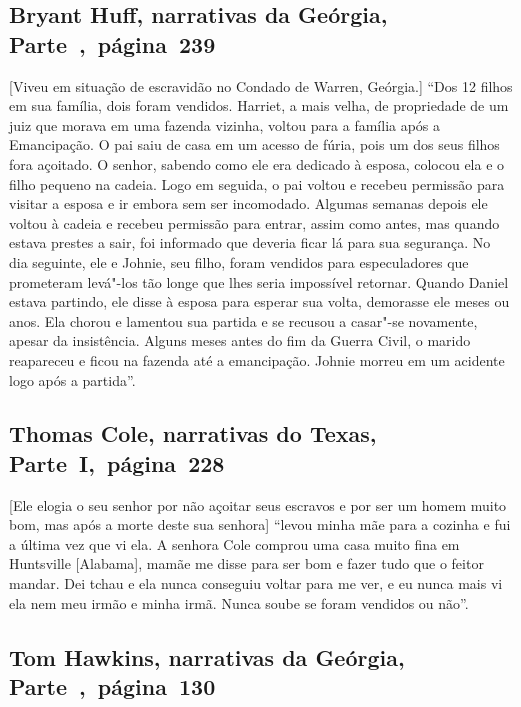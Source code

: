 \subsection{Bryant Huff, narrativas da Geórgia, Parte~,~página~239}
\label{ref152}

{[}Viveu em situação de escravidão no Condado de Warren, Geórgia.{]} ``Dos 12 filhos em sua família, dois foram vendidos. Harriet, a mais
velha, de propriedade de um juiz que morava em uma fazenda vizinha,
voltou para a família após a Emancipação. O pai saiu de casa em um
acesso de fúria, pois um dos seus filhos fora açoitado. O senhor,
sabendo como ele era dedicado à esposa, colocou ela e o filho pequeno na
cadeia. Logo em seguida, o pai voltou e recebeu permissão para visitar a
esposa e ir embora sem ser incomodado. Algumas semanas depois ele voltou
à cadeia e recebeu permissão para entrar, assim como antes, mas quando
estava prestes a sair, foi informado que deveria ficar lá para sua
segurança. No dia seguinte, ele e Johnie, seu filho, foram vendidos para
especuladores que prometeram levá"-los tão longe que lhes seria
impossível retornar. Quando Daniel estava partindo, ele disse à esposa
para esperar sua volta, demorasse ele meses ou anos. Ela chorou e
lamentou sua partida e se recusou a casar"-se novamente, apesar da
insistência. Alguns meses antes do fim da Guerra Civil, o marido
reapareceu e ficou na fazenda até a emancipação. Johnie morreu em um
acidente logo após a partida''.

\subsection{Thomas Cole, narrativas do Texas, Parte~I,~página~228} \label{ref56}

{[}Ele elogia o seu senhor por não açoitar seus escravos e por ser um
homem muito bom, mas após a morte deste sua senhora{]} ``levou minha mãe
para a cozinha e fui a última vez que vi ela. A senhora Cole comprou uma
casa muito fina em Huntsville {[}Alabama{]}, mamãe me disse para ser bom
e fazer tudo que o feitor mandar. Dei tchau e ela nunca conseguiu voltar
para me ver, e eu nunca mais vi ela nem meu irmão e minha irmã. Nunca
soube se foram vendidos ou não''.

\subsection{Tom Hawkins, narrativas da Geórgia, Parte~,~página~130}
\label{ref127}


